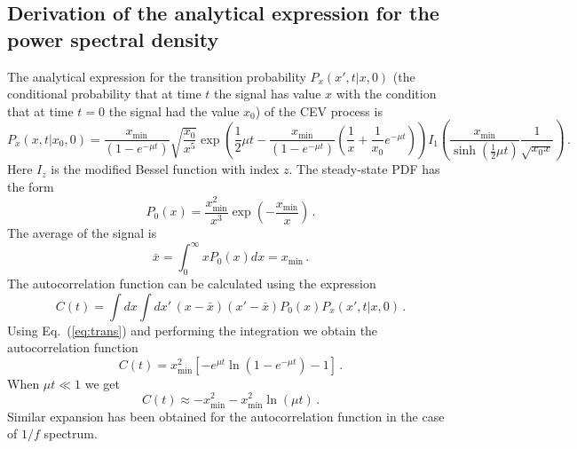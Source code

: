 \documentclass{article}
\begin{document}
\subsection{Derivation of the analytical expression for the power spectral density}

The analytical expression for the transition probability $P_{x}(x',t|x,0)$
(the conditional probability that at time $t$ the signal has value
$x$ with the condition that at time $t=0$ the signal had the value
$x_{0}$) of the CEV process is \cite{kazakevicius2016}
\begin{equation}
P_{x}(x,t|x_{0},0)=\frac{x_{\mathrm{min}}}{(1-e^{-\mu t})}
\sqrt{\frac{x_{0}}{x^{5}}}\exp\left(\frac{1}{2}\mu t
-\frac{x_{\mathrm{min}}}{(1-e^{-\mu t})}\left(\frac{1}{x}
+\frac{1}{x_{0}}e^{-\mu t}\right)\right)
I_{1}\left(\frac{x_{\mathrm{min}}}{\sinh\left(\frac{1}{2}\mu t\right)}
\frac{1}{\sqrt{x_{0}x}}\right)\,.
\label{eq:trans}
\end{equation}
Here $I_{z}$ is the modified Bessel function with index $z$. The
steady-state PDF has the form
\begin{equation}
P_{0}(x)=\frac{x_{\mathrm{min}}^{2}}{x^{3}}
\exp\left(-\frac{x_{\mathrm{min}}}{x}\right)\,.
\end{equation}
The average of the signal is
\begin{equation}
\bar{x}=\int_{0}^{\infty}xP_{0}(x)dx=x_{\mathrm{min}}\,.
\end{equation}
The autocorrelation function can be calculated using the expression
\begin{equation}
C(t)=\int dx\int dx'\,(x-\bar{x})(x'-\bar{x})P_{0}(x)P_{x}(x',t|x,0)\,.
\end{equation}
Using Eq.~(\ref{eq:trans}) and performing the integration we obtain
the autocorrelation function
\begin{equation}
C(t)=x_{\mathrm{min}}^{2}\left[-e^{\mu t}
\ln\left(1-e^{-\mu t}\right)-1\right]\,.
\label{eq:autocorr}
\end{equation}
When $\mu t\ll1$ we get
\begin{equation}
C(t)\approx-x_{\mathrm{min}}^{2}-x_{\mathrm{min}}^{2}\ln(\mu t)\,.
\end{equation}
Similar expansion has been obtained for the autocorrelation function
in the case of $1/f$ spectrum.
\end{document}
